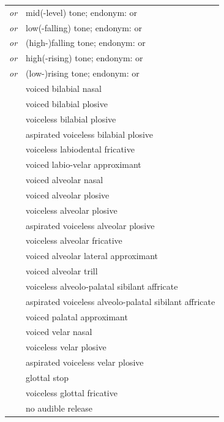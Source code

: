 \documentclass{article}
\begin{document}
\begin{xltabular}{\textwidth}{lL}
   \textit{or} \ipa{\={}} & mid(-level) tone; endonym:  or  \\
   \textit{or} \ipa{\`{}} & low(-falling) tone; endonym:  or  \\
   \textit{or} \ipa{\^{}} & (high-)falling tone; endonym:  or  \\
   \textit{or} \ipa{\'{}} & high(-rising) tone; endonym:  or  \\
   \textit{or} \ipa{\v{}} & (low-)rising tone; endonym:  or  \\
   & voiced bilabial nasal \\
   & voiced bilabial plosive \\
   & voiceless bilabial plosive \\
   & aspirated voiceless bilabial plosive \\
   & voiceless labiodental fricative \\
   & voiced labio-velar approximant \\
   & voiced alveolar nasal \\
   & voiced alveolar plosive \\
   & voiceless alveolar plosive \\
   & aspirated voiceless alveolar plosive \\
   & voiceless alveolar fricative \\
   & voiced alveolar lateral approximant \\
   & voiced alveolar trill \\
  \ipa{\texttctclig} & voiceless alveolo-palatal sibilant affricate \\
   & aspirated voiceless alveolo-palatal sibilant affricate\\
   & voiced palatal approximant \\
   & voiced velar nasal \\
   & voiceless velar plosive \\
   & aspirated voiceless velar plosive \\
   & glottal stop \\
   & voiceless glottal fricative \\
  \ipa{\textcorner} & no audible release \\
\end{xltabular}
\end{document}
